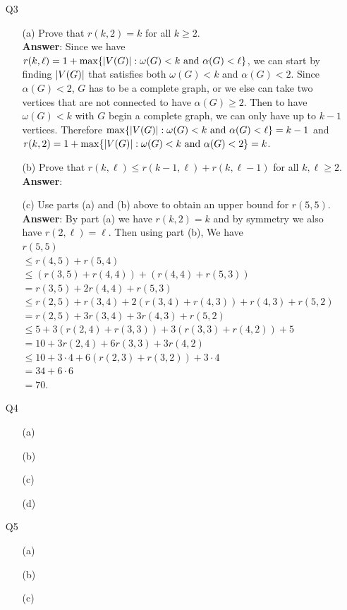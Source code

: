 \documentclass{article}
\begin{document}
\newpage
\begin{itemize}
      \item [Q3]
            \begin{itemize}
                  \item [(a)] Prove that $r(k,2)=k$ for all $k\geq 2$.\\
                        \textbf{Answer}: Since we have $r(k,\ell)=1+\max\{\abs{V(G)}:\omega(G)<k\text{ and }\alpha(G)<\ell\}$, we can start by finding $\abs{V(G)}$ that satisfies both $\omega(G)<k$ and $\alpha(G)<2$. Since $\alpha(G)<2$, $G$ has to be a complete graph, or we else can take two vertices that are not connected to have $\alpha(G)\geq 2$. Then to have $\omega(G)<k$ with $G$ begin a complete graph, we can only have up to $k-1$ vertices. Therefore $\max\{\abs{V(G)}:\omega(G)<k\text{ and }\alpha(G)<\ell\}=k-1$ and $r(k,2)=1+\max\{\abs{V(G)}:\omega(G)<k\text{ and }\alpha(G)<2\}=k$.
                  \item [(b)] Prove that $r(k,\ell)\leq r(k-1,\ell)+r(k,\ell-1)$ for all $k,\ell\geq 2$.\\
                  \textbf{Answer}:
                  \item [(c)] Use parts (a) and (b) above to obtain an upper bound for $r(5,5)$.\\
                  \textbf{Answer}: By part (a) we have $r(k,2)=k$ and by symmetry we also have $r(2,\ell)=\ell$. Then using part (b), We have \\
                  $r(5,5)$\\$\leq r(4,5)+r(5,4)$\\$\leq (r(3,5)+r(4,4))+(r(4,4)+r(5,3))$\\$=r(3,5)+2r(4,4)+r(5,3)$\\$\leq r(2,5)+r(3,4)+2(r(3,4)+r(4,3))+r(4,3)+r(5,2)$\\$=r(2,5)+3r(3,4)+3r(4,3)+r(5,2)$\\$\leq 5+3(r(2,4)+r(3,3))+3(r(3,3)+r(4,2))+5$\\$=10+3r(2,4)+6r(3,3)+3r(4,2)$\\$\leq 10+3\cdot 4+6(r(2,3)+r(3,2))+3\cdot 4$\\$=34+6\cdot 6$\\$=70$.
            \end{itemize}
\end{itemize}

\newpage
\begin{itemize}
      \item [Q4]
            \begin{itemize}
                  \item [(a)]
                  \item [(b)]
                  \item [(c)]
                  \item [(d)]
            \end{itemize}
\end{itemize}

\newpage
\begin{itemize}
      \item [Q5]
            \begin{itemize}
                  \item [(a)]
                  \item [(b)]
                  \item [(c)]
            \end{itemize}
\end{itemize}
\end{document}
